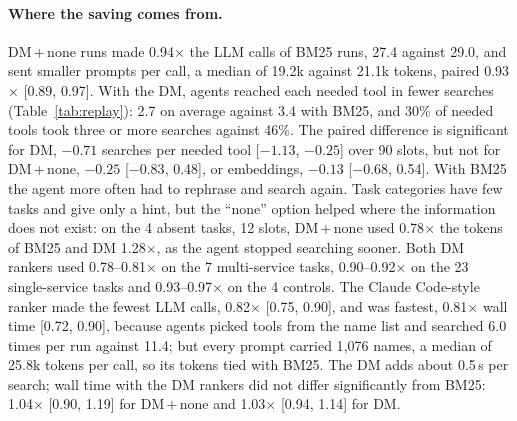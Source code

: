 \documentclass[11pt]{article}
\newcommand{\dmn}{DM\,+\,none}
\begin{document}
\paragraph{Where the saving comes from.} \dmn{} runs made 0.94$\times$ the LLM calls of BM25 runs, 27.4 against
29.0, and sent smaller prompts per call, a median of 19.2k against 21.1k tokens, paired 0.93$\times$ [0.89,
0.97]. With the DM, agents reached each needed tool in fewer searches (Table~\ref{tab:replay}): 2.7 on average
against 3.4 with BM25, and 30\% of needed tools took three or more searches against 46\%. The paired difference
is significant for DM, $-0.71$ searches per needed tool [$-1.13$, $-0.25$] over 90 slots, but not for \dmn{},
$-0.25$ [$-0.83$, 0.48], or embeddings, $-0.13$ [$-0.68$, 0.54]. With BM25 the agent more often had to rephrase
and search again. Task categories have few tasks and give only a hint, but the ``none'' option helped where the
information does not exist: on the 4 absent tasks, 12 slots, \dmn{} used 0.78$\times$ the tokens of BM25 and DM
1.28$\times$, as the agent stopped searching sooner. Both DM rankers used 0.78--0.81$\times$ on the 7
multi-service tasks, 0.90--0.92$\times$ on the 23 single-service tasks and 0.93--0.97$\times$ on the 4 controls.
The Claude Code-style ranker made the fewest LLM calls, 0.82$\times$ [0.75, 0.90], and was fastest, 0.81$\times$
wall time [0.72, 0.90], because agents picked tools from the name list and searched 6.0 times per run against
11.4; but every prompt carried 1{,}076 names, a median of 25.8k tokens per call, so its tokens tied with BM25. The
DM adds about 0.5\,s per search; wall time with the DM rankers did not differ significantly from BM25:
1.04$\times$ [0.90, 1.19] for \dmn{} and 1.03$\times$ [0.94, 1.14] for DM.
\end{document}
